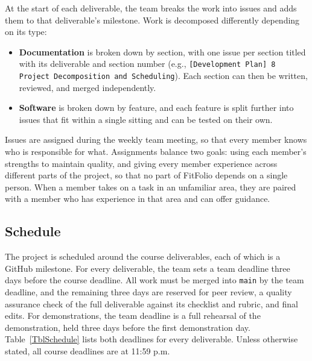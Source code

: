 \documentclass{article}
\begin{document}
At the start of each deliverable, the team breaks the work into issues and adds them to that deliverable's milestone. Work is decomposed differently depending on its type:

\begin{itemize}
  \item \textbf{Documentation} is broken down by section, with one issue per section titled with its deliverable and section number (e.g., \texttt{[Development Plan] 8 Project Decomposition and Scheduling}). Each section can then be written, reviewed, and merged independently.
  \item \textbf{Software} is broken down by feature, and each feature is split further into issues that fit within a single sitting and can be tested on their own.
\end{itemize}

Issues are assigned during the weekly team meeting, so that every member knows who is responsible for what. Assignments balance two goals: using each member's strengths to maintain quality, and giving every member experience across different parts of the project, so that no part of FitFolio depends on a single person. When a member takes on a task in an unfamiliar area, they are paired with a member who has experience in that area and can offer guidance.

\subsection{Schedule} \label{SecSchedule}

The project is scheduled around the course deliverables, each of which is a GitHub milestone. 
For every deliverable, the team sets a team deadline three days before the course deadline. 
All work must be merged into \texttt{main} by the team deadline, and the remaining three days are reserved for peer review, a quality assurance check of the full deliverable against its checklist and rubric, and final edits. 
For demonstrations, the team deadline is a full rehearsal of the demonstration, held three days before the first demonstration day. 
Table~\ref{TblSchedule} lists both deadlines for every deliverable. Unless otherwise stated, all course deadlines are at 11:59 p.m.
\end{document}
